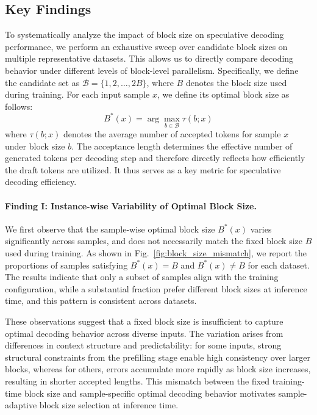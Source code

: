 \documentclass{llmxive}
\begin{document}
\subsection{Key Findings}
To systematically analyze the impact of block size on speculative decoding performance, we perform an exhaustive sweep over candidate block sizes on multiple representative datasets. This allows us to directly compare decoding behavior under different levels of block-level parallelism. Specifically, we define the candidate set as $\mathcal{B} = \{1, 2, \ldots, 2B\}$, where $B$ denotes the block size used during training. For each input sample $x$, we define its optimal block size as follows:
\begin{equation}
\label{B*}
B^*(x) = \arg\max_{b \in \mathcal{B}} \tau(b; x)
\end{equation}
where $\tau(b; x)$ denotes the average number of accepted tokens for sample $x$ under block size $b$. The acceptance length determines the effective number of generated tokens per decoding step and therefore directly reflects how efficiently the draft tokens are utilized. It thus serves as a key metric for speculative decoding efficiency.

\paragraph{Finding I: Instance-wise Variability of Optimal Block Size.}
We first observe that the sample-wise optimal block size $B^*(x)$ varies significantly across samples, and does not necessarily match the fixed block size $B$ used during training. As shown in Fig.~\ref{fig:block_size_mismatch}, we report the proportions of samples satisfying $B^*(x)=B$ and $B^*(x)\neq B$ for each dataset. The results indicate that only a subset of samples align with the training configuration, while a substantial fraction prefer different block sizes at inference time, and this pattern is consistent across datasets.

These observations suggest that a fixed block size is insufficient to capture optimal decoding behavior across diverse inputs. The variation arises from differences in context structure and predictability: for some inputs, strong structural constraints from the prefilling stage enable high consistency over larger blocks, whereas for others, errors accumulate more rapidly as block size increases, resulting in shorter accepted lengths. This mismatch between the fixed training-time block size and sample-specific optimal decoding behavior motivates sample-adaptive block size selection at inference time.
\end{document}
